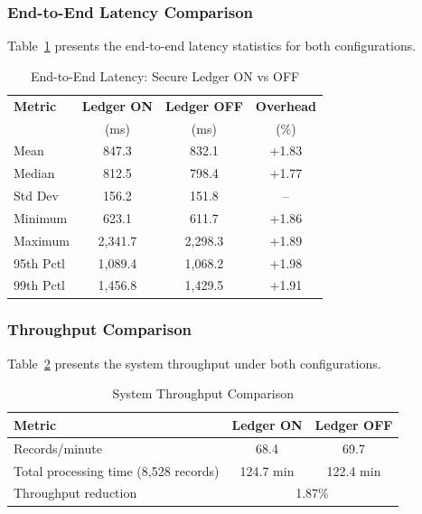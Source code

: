 \documentclass[10pt,twocolumn]{article}
\begin{document}
\subsubsection{End-to-End Latency Comparison}

Table~\ref{tab:latency_comparison} presents the end-to-end latency statistics for both configurations.

\begin{table}[htbp]
\centering
\caption{End-to-End Latency: Secure Ledger ON vs OFF}
\label{tab:latency_comparison}
\footnotesize
\begin{tabular}{@{}lccc@{}}
\toprule
\textbf{Metric} & \textbf{Ledger ON} & \textbf{Ledger OFF} & \textbf{Overhead} \\
 & (ms) & (ms) & (\%) \\
\midrule
Mean & 847.3 & 832.1 & +1.83 \\
Median & 812.5 & 798.4 & +1.77 \\
Std Dev & 156.2 & 151.8 & -- \\
Minimum & 623.1 & 611.7 & +1.86 \\
Maximum & 2,341.7 & 2,298.3 & +1.89 \\
95th Pctl & 1,089.4 & 1,068.2 & +1.98 \\
99th Pctl & 1,456.8 & 1,429.5 & +1.91 \\
\bottomrule
\end{tabular}
\end{table}

\subsubsection{Throughput Comparison}

Table~\ref{tab:throughput} presents the system throughput under both configurations.

\begin{table}[htbp]
\centering
\caption{System Throughput Comparison}
\label{tab:throughput}
\footnotesize
\begin{tabular}{@{}lcc@{}}
\toprule
\textbf{Metric} & \textbf{Ledger ON} & \textbf{Ledger OFF} \\
\midrule
Records/minute & 68.4 & 69.7 \\
Total processing time (8,528 records) & 124.7 min & 122.4 min \\
Throughput reduction & \multicolumn{2}{c}{1.87\%} \\
\bottomrule
\end{tabular}
\end{table}
\end{document}
